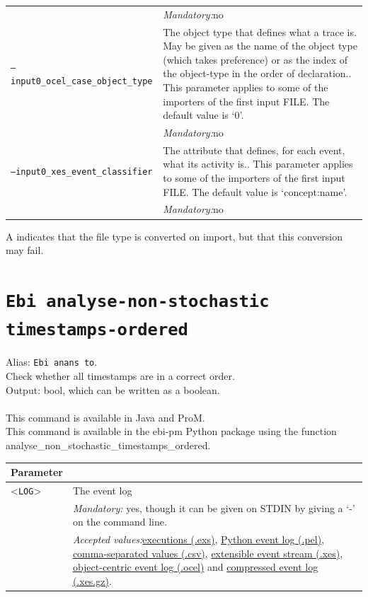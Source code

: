{\begin{tabularx}{\linewidth}{lX}
&\textit{Mandatory:}\quad no\\
\texttt{--input0\_ocel\_case\_object\_type} & The object type that defines what a trace is. May be given as the name of the object type (which takes preference) or as the index of the object-type in the order of declaration.. This parameter applies to some of the importers of the first input FILE. The default value is `0'.\\
&\textit{Mandatory:}\quad no\\
\texttt{--input0\_xes\_event\_classifier} & The attribute that defines, for each event, what its activity is.. This parameter applies to some of the importers of the first input FILE. The default value is `concept:name'.\\
&\textit{Mandatory:}\quad no\\
\bottomrule
\end{tabularx}
A \textdagger{} indicates that the file type is converted on import, but that this conversion may fail.
\clearpage\section{\texttt{Ebi analyse-non-stochastic timestamps-ordered}}
\label{command:Ebi analyse-non-stochastic timestamps-ordered}
Alias: \texttt{Ebi anans to}.\\
Check whether all timestamps are in a correct order.\\
\noindent Output: bool, which can be written as a boolean.\\
\\This command is available in Java and ProM.
\\This command is available in the ebi-pm Python package using the function analyse\_non\_stochastic\_timestamps\_ordered.
\begin{tabularx}{\linewidth}{lX}
\toprule
Parameter \\\midrule
<\texttt{LOG}>&The event log\\
&\textit{Mandatory:} \quad yes, though it can be given on STDIN by giving a `-' on the command line.\\
&\textit{Accepted values:}\quad \hyperref[filehandler:executions]{executions (.exs)}, \hyperref[filehandler:Python event log]{Python event log (.pel)}, \hyperref[filehandler:comma-separated values]{comma-separated values (.csv)}, \hyperref[filehandler:extensible event stream]{extensible event stream (.xes)}, \hyperref[filehandler:object-centric event log]{object-centric event log (.ocel)} and \hyperref[filehandler:compressed event log]{compressed event log (.xes.gz)}.\\

\end{tabularx}}
